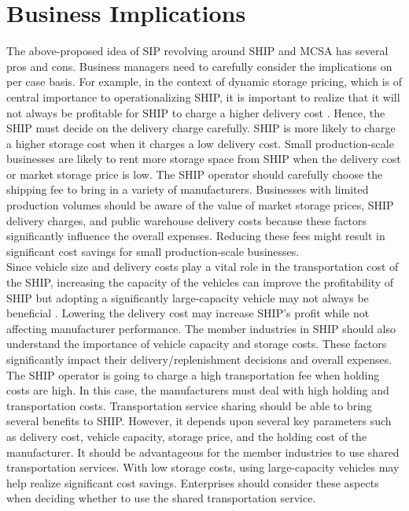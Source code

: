 \documentclass[paper=a4wide, fontsize=12pt]{scrartcl}
\begin{document}
\section{Business Implications}

The above-proposed idea of SIP revolving around SHIP and MCSA has several pros and cons. Business managers need to carefully consider the implications on per case basis. For example, in the context of dynamic storage pricing, which is of central importance to operationalizing SHIP, it is important to realize that it will not always be profitable for SHIP to charge a higher delivery cost \cite{6736130}. Hence, the SHIP must decide on the delivery charge carefully. SHIP is more likely to charge a higher storage cost when it charges a low delivery cost. Small production-scale businesses are likely to rent more storage space from SHIP when the delivery cost or market storage price is low. The SHIP operator should carefully choose the shipping fee to bring in a variety of manufacturers. Businesses with limited production volumes should be aware of the value of market storage prices, SHIP delivery charges, and public warehouse delivery costs because these factors significantly influence the overall expenses. Reducing these fees might result in significant cost savings for small production-scale businesses. \\

Since vehicle size and delivery costs play a vital role in the transportation cost of the SHIP, increasing the capacity of the vehicles can improve the profitability of SHIP but adopting a significantly large-capacity vehicle may not always be beneficial \cite{RePEc:eee:proeco}. Lowering the delivery cost may increase SHIP's profit while not affecting manufacturer performance. The member industries in SHIP should also understand the importance of vehicle capacity and storage costs. These factors significantly impact their delivery/replenishment decisions and overall expenses. The SHIP operator is going to charge a high transportation fee when holding costs are high. In this case, the manufacturers must deal with high holding and transportation costs. Transportation service sharing should be able to bring several benefits to SHIP. However, it depends upon several key parameters such as delivery cost, vehicle capacity, storage price, and the holding cost of the manufacturer. It should be advantageous for the member industries to use shared transportation services. With low storage costs, using large-capacity vehicles may help realize significant cost savings. Enterprises should consider these aspects when deciding whether to use the shared transportation service. \\
\end{document}
